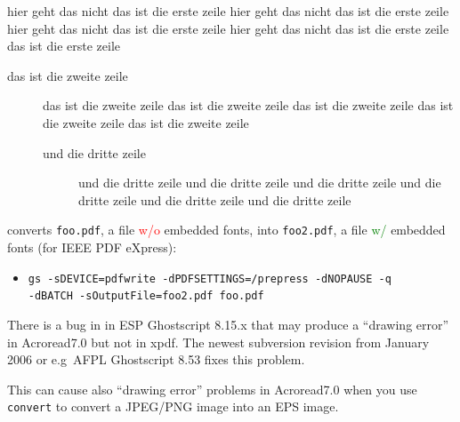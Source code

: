 \documentclass[11pt, a4paper, landscape]{article}
\begin{document}
\NewPage{}
\vfill
\begin{description}
  \setlength{\itemsep}{3ex}
  \setlength{\leftmargini}{-5em}   
  \setlength{\leftmarginii}{-5em}  
  \setlength{\leftmarginiii}{-5em}
\item[Das ist die erste Zeile] hier geht das nicht das ist die erste
  zeile hier geht das nicht das ist die erste zeile hier geht das
  nicht das ist die erste zeile hier geht das nicht das ist die erste
  zeile das ist die erste zeile
  \begin{description}
  \item[das ist die zweite zeile] das ist die zweite zeile das ist die
    zweite zeile das ist die zweite zeile das ist die zweite zeile das
    ist die zweite zeile
    \begin{description}
    \item[und die dritte zeile] und die dritte zeile und die dritte
      zeile und die dritte zeile und die dritte zeile und die dritte
      zeile und die dritte zeile
    \end{description}
  \end{description}
\end{description}
\vfill

\NewPage{}
\vfill
converts \texttt{foo.pdf}, a file \textcolor{red}{w/o} embedded fonts, into \texttt{foo2.pdf}, a file \textcolor{green}{w/} embedded fonts (\eg for IEEE PDF eXpress):
\begin{itemize}
\item \texttt{gs -sDEVICE=pdfwrite -dPDFSETTINGS=/prepress -dNOPAUSE -q \\ -dBATCH -sOutputFile=foo2.pdf foo.pdf}
\end{itemize}
\vfill 
\alert{There is a bug in in ESP Ghostscript 8.15.x} that may produce a
``drawing error'' in Acroread7.0 but not in xpdf. The newest subversion revision
from January 2006 or e.g\ AFPL Ghostscript 8.53 fixes this problem.

This can cause also ``drawing error'' problems in Acroread7.0 when you use
\texttt{convert} to convert \eg a JPEG/PNG image into an EPS image.
\vfill
\end{document}
